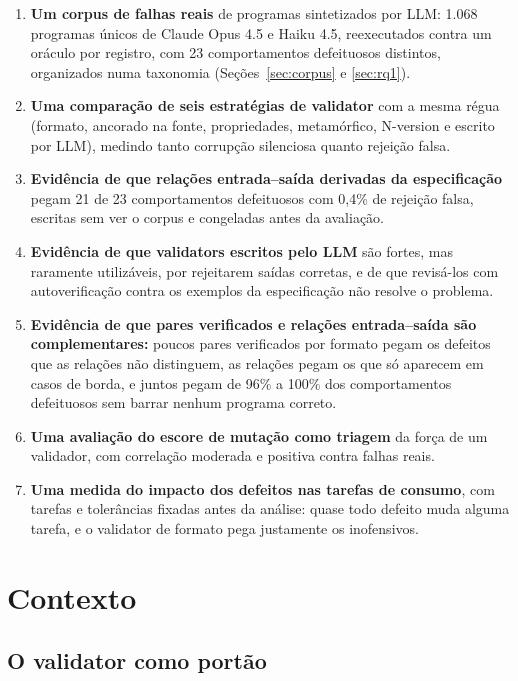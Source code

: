 \documentclass[sigconf,nonacm]{acmart}
\begin{document}
\begin{enumerate}
\item \textbf{Um corpus de falhas reais} de programas sintetizados por LLM: 1.068 programas únicos de Claude Opus 4.5 e Haiku 4.5, reexecutados contra um oráculo por registro, com 23 comportamentos defeituosos distintos, organizados numa taxonomia (Seções~\ref{sec:corpus} e \ref{sec:rq1}).
\item \textbf{Uma comparação de seis estratégias de validator} com a mesma régua (formato, ancorado na fonte, propriedades, metamórfico, N-version \cite{avizienis1985nversion} e escrito por LLM), medindo tanto corrupção silenciosa quanto rejeição falsa.
\item \textbf{Evidência de que relações entrada--saída derivadas da especificação} pegam 21 de 23 comportamentos defeituosos com 0,4\% de rejeição falsa, escritas sem ver o corpus e congeladas antes da avaliação.
\item \textbf{Evidência de que validators escritos pelo LLM} são fortes, mas raramente utilizáveis, por rejeitarem saídas corretas, e de que revisá-los com autoverificação contra os exemplos da especificação não resolve o problema.
\item \textbf{Evidência de que pares verificados e relações entrada--saída são complementares:} poucos pares verificados por formato pegam os defeitos que as relações não distinguem, as relações pegam os que só aparecem em casos de borda, e juntos pegam de 96\% a 100\% dos comportamentos defeituosos sem barrar nenhum programa correto.
\item \textbf{Uma avaliação do escore de mutação como triagem} da força de um validador, com correlação moderada e positiva contra falhas reais.
\item \textbf{Uma medida do impacto dos defeitos nas tarefas de consumo}, com tarefas e tolerâncias fixadas antes da análise: quase todo defeito muda alguma tarefa, e o validator de formato pega justamente os inofensivos.
\end{enumerate}

\section{Contexto}
\label{sec:contexto}

\subsection{O validator como portão}
\end{document}
